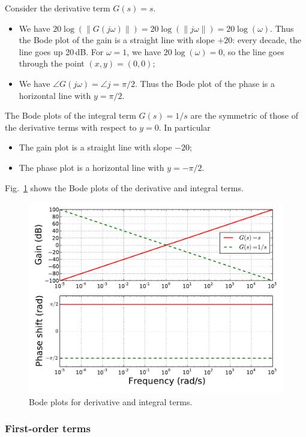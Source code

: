 \documentclass[a4paper,11pt]{report}
\theoremstyle{definition}
\begin{document}
Consider the derivative term $G(s)=s$. 
\begin{itemize}
\item We have
  $20\log(\|G(j\omega)\|)=20\log(\|j\omega\|)=20\log(\omega)$. Thus
  the Bode plot of the gain is a straight line with slope $+20$: every
  decade, the line goes up 20\,dB. For $\omega=1$, we have
  $20\log(\omega)=0$, so the line goes through the point
  $(x,y)=(0,0)$;
\item We have $\angle G(j\omega)=\angle j=\pi/2$. Thus the Bode plot
  of the phase is a horizontal line with $y=\pi/2$.
\end{itemize}

The Bode plots of the integral term $G(s)=1/s$ are the symmetric of
those of the derivative terms with respect to $y=0$. In particular
\begin{itemize}
\item The gain plot is a straight line with slope $-20$;
\item The phase plot is a horizontal line with $y=-\pi/2$.
\end{itemize}

Fig.~\ref{fig:bode-di} shows the Bode plots of the derivative and
integral terms.

\begin{figure}[H]
  \centering
  \includegraphics[width=12cm]{fig/bode-di.pdf}
  \caption{Bode plots for derivative and integral terms.}
  \label{fig:bode-di}
\end{figure}


\subsubsection{First-order terms}
\end{document}

